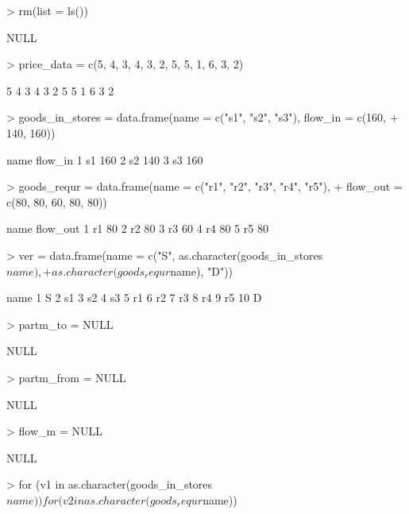 \documentclass[a4paper,11pt]{scrartcl}
\begin{document}
\begin{Schunk}
\begin{Sinput}
> rm(list = ls())
\end{Sinput}
\begin{Soutput}
NULL
\end{Soutput}
\begin{Sinput}
> price_data = c(5, 4, 3, 4, 3, 2, 5, 5, 1, 6, 3, 2)
\end{Sinput}
\begin{Soutput}
 [1] 5 4 3 4 3 2 5 5 1 6 3 2
\end{Soutput}
\begin{Sinput}
> goods_in_stores = data.frame(name = c("s1", "s2", "s3"), flow_in = c(160, 
+     140, 160))
\end{Sinput}
\begin{Soutput}
  name flow_in
1   s1     160
2   s2     140
3   s3     160
\end{Soutput}
\begin{Sinput}
> goods_requr = data.frame(name = c("r1", "r2", "r3", "r4", "r5"), 
+     flow_out = c(80, 80, 60, 80, 80))
\end{Sinput}
\begin{Soutput}
  name flow_out
1   r1       80
2   r2       80
3   r3       60
4   r4       80
5   r5       80
\end{Soutput}
\begin{Sinput}
> ver = data.frame(name = c("S", as.character(goods_in_stores$name), 
+     as.character(goods_requr$name), "D"))
\end{Sinput}
\begin{Soutput}
   name
1     S
2    s1
3    s2
4    s3
5    r1
6    r2
7    r3
8    r4
9    r5
10    D
\end{Soutput}
\begin{Sinput}
> partm_to = NULL
\end{Sinput}
\begin{Soutput}
NULL
\end{Soutput}
\begin{Sinput}
> partm_from = NULL
\end{Sinput}
\begin{Soutput}
NULL
\end{Soutput}
\begin{Sinput}
> flow_m = NULL
\end{Sinput}
\begin{Soutput}
NULL
\end{Soutput}
\begin{Sinput}
> for (v1 in as.character(goods_in_stores$name)) for (v2 in as.character(goods_requr$name)) {
}
\end{Sinput}
\end{Schunk}
\end{document}
